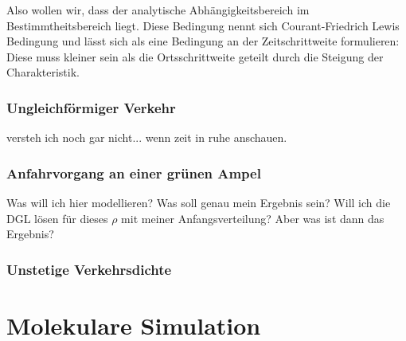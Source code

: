 \documentclass[]{article}
\begin{document}
Also wollen wir, dass der analytische Abhängigkeitsbereich im Bestimmtheitsbereich liegt. Diese Bedingung nennt sich Courant-Friedrich Lewis Bedingung und lässt sich als eine Bedingung an der Zeitschrittweite formulieren: Diese muss kleiner sein als die Ortsschrittweite geteilt durch die Steigung der Charakteristik. 
  
\subsubsection*{Ungleichförmiger Verkehr}  
  
versteh ich noch gar nicht... wenn zeit in ruhe anschauen.

  
\subsubsection*{Anfahrvorgang an einer grünen Ampel}

Was will ich hier modellieren? Was soll genau mein Ergebnis sein? Will ich die DGL lösen für dieses $\rho$ mit meiner Anfangsverteilung? Aber was ist dann das Ergebnis? 

\subsubsection*{Unstetige Verkehrsdichte}



\section{Molekulare Simulation}

  
\end{document}
